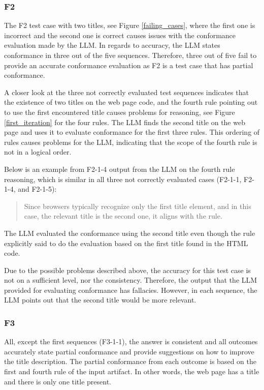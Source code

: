 \subsubsection{F2}

The F2 test case with two titles, see Figure \ref{failing_cases}, where the first one is incorrect and the second one is correct causes issues with the conformance evaluation made by the LLM. In regards to accuracy, the LLM states conformance in three out of the five sequences. Therefore, three out of five fail to provide an accurate conformance evaluation as F2 is a test case that has partial conformance.

A closer look at the three not correctly evaluated test sequences indicates that the existence of two titles on the web page code, and the fourth rule pointing out to use the first encountered title causes problems for reasoning, see Figure \ref{first_iteration} for the four rules. The LLM finds the second title on the web page and uses it to evaluate conformance for the first three rules. This ordering of rules causes problems for the LLM, indicating that the scope of the fourth rule is not in a logical order.

Below is an example from F2-1-4 output from the LLM on the fourth rule reasoning, which is similar in all three not correctly evaluated cases (F2-1-1, F2-1-4, and F2-1-5): \blockquote{Since browsers typically recognize only the first title element, and in this case, the relevant title is the second one, it aligns with the rule.}. The LLM evaluated the conformance using the second title even though the rule explicitly said to do the evaluation based on the first title found in the HTML code.

Due to the possible problems described above, the accuracy for this test case is not on a sufficient level, nor the consistency. Therefore, the output that the LLM provided for evaluating conformance has fallacies. However, in each sequence, the LLM points out that the second title would be more relevant.

\subsubsection{F3}

All, except the first sequences (F3-1-1), the answer is consistent and all outcomes accurately state partial conformance and provide suggestions on how to improve the title description. The partial conformance from each outcome is based on the first and fourth rule of the input artifact. In other words, the web page has a title and there is only one title present. 

